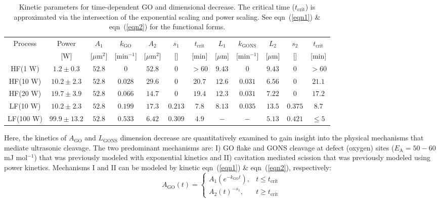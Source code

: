 \begin{table}
 \begin{center}
 \caption{Kinetic parameters for time-dependent GO and dimensional decrease. The critical time ($t_{\mathrm{crit}}$) is approximated via the intersection of the exponential scaling and power scaling. See eqn~(\ref{eqn1}) \& eqn~(\ref{eqn2}) for the functional forms.}
  \label{tbl1}
  \begin{tabular}{cc|ccccc|ccccc}
        \hline
        Process & Power & $A_{1}$ & $k_{\mathrm{GO}}$ & $A_{2}$ & $s_{1}$ & $t_{\mathrm{crit}}$ & $L_{1}$ & $k_{\mathrm{GONS}}$ & $L_{2}$ & $s_{2}$ & $t_{\mathrm{crit}}$ \\
         & [W] & [$\mu$m$^{2}$] & [min$^{-1}$] & [$\mu$m$^{2}$] & [] & [min] & [$\mu$m] & [min$^{-1}$] & [$\mu$m] & [] & [min] \\
        \hline
        HF(1 W) & $1.2 \pm 0.3$ & $52.8$ & $0$ & $52.8$ & $0$ & $> 60$ & $9.43$ & $0$ & $9.43$ & $0$ & $> 60$ \\
        HF(10 W) & $10.2 \pm 2.3$ & $52.8$ & $0.028$ & $29.6$ & $0$ & $20.7$ & $12.6$ & $0.031$ & $6.56$ & $0$ & $21.1$ \\
        HF(20 W) & $19.7 \pm 3.9$ & $52.8$ & $0.066$ & $14.7$ & $0$ & $19.4$ & $12.3$ & $0.031$ & $7.22$ & $0$ & $17.2$ \\
        \hline
        LF(10 W) & $10.2 \pm 2.3$ & $52.8$ & $0.199$ & $17.3$ & $0.213$ & $7.8$ & $8.13$ & $0.035$ & $13.5$ & $0.375$ & $8.7$ \\
        LF(100 W) & $99.9 \pm 13.2$ & $52.8$ & $0.533$ & $6.42$ & $0.309$ & $4.9$ & $-$ & $-$ & $5.13$ & $0.421$ & $\leq 5$ \\
        \hline
  \end{tabular}
 \end{center}
\end{table}
Here, the kinetics of $A_{\mathrm{GO}}$ and $L_{\mathrm{GONS}}$ dimension decrease are quantitatively examined to gain insight into the physical mechanisms that mediate ultrasonic cleavage. The two predominant mechanisms are: I) GO flake and GONS cleavage at defect (oxygen) sites ($E_{\mathrm{A}} = 50 - 60$ mJ mol$^{-1}$)\cite{Chakarova2006,Chen2013a,Felts2015} that was previously modeled with exponential kinetics\cite{Kouroupis2014,Rider2014} and II) cavitation mediated scission that was previously modeled using power kinetics.\cite{Khan2010,Paton2014} Mechanisms I and II can be modeled by kinetic eqn~(\ref{eqn1}) \& eqn~(\ref{eqn2}), respectively:
\begin{equation}
    A_{\mathrm{GO}}(t) = \begin{cases} A_{1}(e^{-k_{\mathrm{GO}}t}), & t \leq t_{\mathrm{crit}} \\ A_{2}(t)^{-s_{1}}, & t \geq t_{\mathrm{crit}} \end{cases}
    \label{eqn1}
\end{equation}


